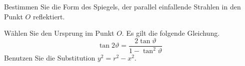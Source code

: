 \begin{atiTask}[
  title = Spieglein, Spieglein...
]
  Bestimmen Sie die Form des Spiegels, der parallel einfallende Strahlen in den Punkt $O$ reflektiert.

  \begin{atiNote}
    Wählen Sie den Ursprung im Punkt $O$.
    Es gilt die folgende Gleichung.
    \[
      \tan 2\vartheta = \frac{2\tan \vartheta}{1-\tan^2 \vartheta}
    \]
    Benutzen Sie die Substitution $y^2 = r^2 - x^2$.
  \end{atiNote}
\end{atiTask}